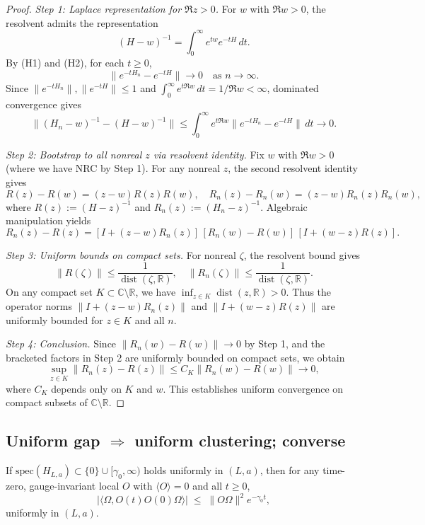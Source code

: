 \documentclass[11pt]{amsart}
\begin{document}
\begin{proof}
\emph{Step 1: Laplace representation for $\Re z > 0$.} For $w$ with $\Re w > 0$, the resolvent admits the representation
\[
  (H-w)^{-1} = \int_0^\infty e^{tw} e^{-tH}\,dt.
\]
By (H1) and (H2), for each $t \ge 0$,
\[
  \|e^{-tH_n} - e^{-tH}\| \to 0 \quad \text{as } n \to \infty.
\]
Since $\|e^{-tH_n}\|, \|e^{-tH}\| \le 1$ and $\int_0^\infty e^{t\Re w}\,dt = 1/\Re w < \infty$, dominated convergence gives
\[
  \|(H_n-w)^{-1} - (H-w)^{-1}\| \le \int_0^\infty e^{t\Re w} \|e^{-tH_n} - e^{-tH}\|\,dt \to 0.
\]

\emph{Step 2: Bootstrap to all nonreal $z$ via resolvent identity.} Fix $w$ with $\Re w > 0$ (where we have NRC by Step 1). For any nonreal $z$, the second resolvent identity gives
\[
  R(z) - R(w) = (z-w)R(z)R(w), \quad R_n(z) - R_n(w) = (z-w)R_n(z)R_n(w),
\]
where $R(z) := (H-z)^{-1}$ and $R_n(z) := (H_n-z)^{-1}$. Algebraic manipulation yields
\[
  R_n(z) - R(z) = [I + (z-w)R_n(z)]\,[R_n(w) - R(w)]\,[I + (w-z)R(z)].
\]

\emph{Step 3: Uniform bounds on compact sets.} For nonreal $\zeta$, the resolvent bound gives
\[
  \|R(\zeta)\| \le \frac{1}{\operatorname{dist}(\zeta,\mathbb{R})}, \quad \|R_n(\zeta)\| \le \frac{1}{\operatorname{dist}(\zeta,\mathbb{R})}.
\]
On any compact set $K \subset \mathbb{C} \setminus \mathbb{R}$, we have $\inf_{z \in K} \operatorname{dist}(z,\mathbb{R}) > 0$. Thus the operator norms $\|I + (z-w)R_n(z)\|$ and $\|I + (w-z)R(z)\|$ are uniformly bounded for $z \in K$ and all $n$.

\emph{Step 4: Conclusion.} Since $\|R_n(w) - R(w)\| \to 0$ by Step 1, and the bracketed factors in Step 2 are uniformly bounded on compact sets, we obtain
\[
  \sup_{z \in K} \|R_n(z) - R(z)\| \le C_K \|R_n(w) - R(w)\| \to 0,
\]
where $C_K$ depends only on $K$ and $w$. This establishes uniform convergence on compact subsets of $\mathbb{C} \setminus \mathbb{R}$.
\end{proof}

\subsection*{Uniform gap $\Rightarrow$ uniform clustering; converse}

\begin{proposition}\label{prop:gap-to-cluster}
If $\mathrm{spec}(H_{L,a})\subset\{0\}\cup[\gamma_0,\infty)$ holds uniformly in $(L,a)$, then for any time-zero, gauge-invariant local $O$ with $\langle O\rangle=0$ and all $t\ge 0$,
\[
  |\langle\Omega, O(t)O(0)\Omega\rangle|\;\le\;\|O\Omega\|^2 e^{-\gamma_0 t},
\]
uniformly in $(L,a)$.
\end{proposition}
\end{document}
